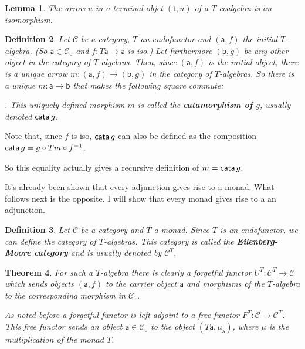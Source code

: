 \documentclass{article}
\newcommand{\cat}[1]{\mathcal{#1}} %
\newcommand{\cato}[1]{\cat{#1}_0} %
\newcommand{\catm}[1]{\cat{#1}_1} %
\newcommand{\ob}[1]{\mathsf{#1}} %
\newcommand{\cata}[1]{\mathsf{cata} \thinspace #1}
\newtheorem{theorem}{Theorem}
\newtheorem{lemma}[theorem]{Lemma}
\newtheorem{definition}[theorem]{Definition}
\begin{document}
\begin{lemma}
	The arrow $u$ in a terminal objet $(\ob{t}, u)$ of a $T$-coalgebra is an isomorphism.
\end{lemma}

\begin{definition}
	Let $\cat{C}$ be a category, $T$ an endofunctor and $(\ob{a},f)$ the initial $T$-algebra. (So $\ob{a} \in \cato{C}$ and $f: T\ob{a} \rightarrow \ob{a}$ is iso.)
	Let furthermore $(\ob{b}, g)$ be any other object in the category of $T$-algebras. Then, since $(\ob{a}, f)$ is the initial object, there is a unique arrow $m: (\ob{a}, f) \rightarrow (\ob{b}, g)$ in the category of $T$-algebras.
	So there is a unique $m: \ob{a} \rightarrow \ob{b}$ that makes the following square commute:
	.
	This uniquely defined morphism $m$ is called the \textbf{catamorphism of $g$}, usually denoted $\cata{g}$.
\end{definition}

Note that, since $f$ is iso, $\cata{g}$ can also be defined as the composition $\cata{g} = g \circ Tm \circ f^{-1}$.

So this equality actually gives a recursive definition of $m = \cata{g}$.

It's already been shown that every adjunction gives rise to a monad. What follows next is the opposite.
I will show that every monad gives rise to a an adjunction.

\begin{definition}
	Let $\cat{C}$ be a category and $T$ a monad. Since $T$ is an endofunctor, we can define the category of $T$-algebras.
	This category is called the \textbf{Eilenberg-Moore category} and is usually denoted by $\cat{C}^T$.
\end{definition}

\begin{theorem}
	For such a $T$-algebra there is clearly a forgetful functor $U^T: \cat{C}^T \rightarrow \cat{C}$ which sends objects $(\ob{a}, f)$ to the carrier object $\ob{a}$
	and morphisms of the $T$-algebra to the corresponding morphism in $\catm{C}$.

	As noted before a forgetful functor is left adjoint to a free functor $F^T: \cat{C} \rightarrow \cat{C}^T$.
	This free functor sends an object $\ob{a} \in \cato{C}$ to the object $(T\ob{a}, \mu_\ob{a})$, where $\mu$ is the multiplication of the monad $T$.
\end{theorem}
\end{document}
